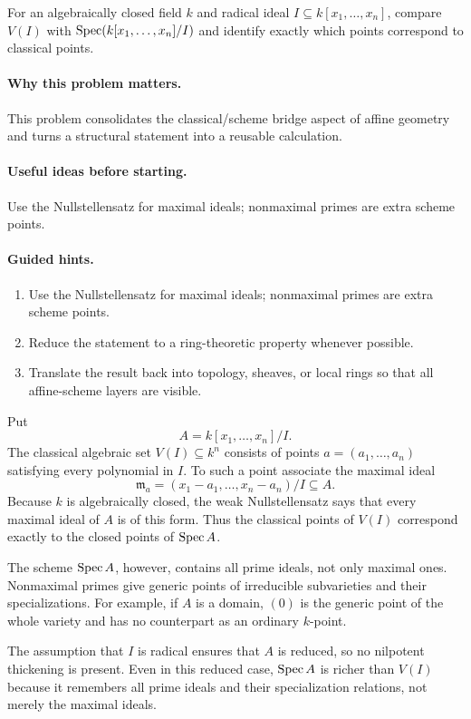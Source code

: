 \begin{problem}\label{prob:vi18-p17}
For an algebraically closed field $k$ and radical ideal $I\subseteq k[x_1,\dots,x_n]$, compare $V(I)$ with $\operatorname{Spec}(k[x_1,\dots,x_n]/I)$ and identify exactly which points correspond to classical points.
\end{problem}

\ifdefined\FullProblemDossiers
\paragraph{Why this problem matters.}
This problem consolidates the classical/scheme bridge aspect of affine geometry and turns a structural statement into a reusable calculation.

\paragraph{Useful ideas before starting.}
Use the Nullstellensatz for maximal ideals; nonmaximal primes are extra scheme points.

\paragraph{Guided hints.}
\begin{enumerate}
\item Use the Nullstellensatz for maximal ideals; nonmaximal primes are extra scheme points.
\item Reduce the statement to a ring-theoretic property whenever possible.
\item Translate the result back into topology, sheaves, or local rings so that all affine-scheme layers are visible.
\end{enumerate}

\begin{solution}
Put
\[
A=k[x_1,\dots,x_n]/I.
\]
The classical algebraic set $V(I)\subseteq k^n$ consists of points $a=(a_1,\dots,a_n)$ satisfying every polynomial in $I$. To such a point associate the maximal ideal
\[
\mathfrak m_a=(x_1-a_1,\dots,x_n-a_n)/I\subseteq A.
\]
Because $k$ is algebraically closed, the weak Nullstellensatz says that every maximal ideal of $A$ is of this form. Thus the classical points of $V(I)$ correspond exactly to the closed points of $\operatorname{Spec} A$.

The scheme $\operatorname{Spec} A$, however, contains all prime ideals, not only maximal ones. Nonmaximal primes give generic points of irreducible subvarieties and their specializations. For example, if $A$ is a domain, $(0)$ is the generic point of the whole variety and has no counterpart as an ordinary $k$-point.

The assumption that $I$ is radical ensures that $A$ is reduced, so no nilpotent thickening is present. Even in this reduced case, $\operatorname{Spec} A$ is richer than $V(I)$ because it remembers all prime ideals and their specialization relations, not merely the maximal ideals.
\end{solution}


